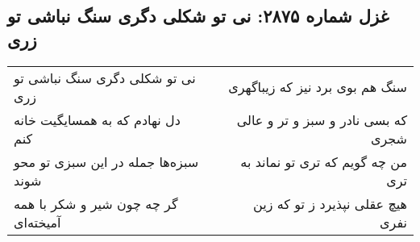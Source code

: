 \begin{center}
\section*{غزل شماره ۲۸۷۵: نی تو شکلی دگری سنگ نباشی تو زری}
\label{sec:2875}
\begin{longtable}{l p{0.5cm} r}
نی تو شکلی دگری سنگ نباشی تو زری
&&
سنگ هم بوی برد نیز که زیباگهری
\\
دل نهادم که به همسایگیت خانه کنم
&&
که بسی نادر و سبز و تر و عالی شجری
\\
سبزه‌ها جمله در این سبزی تو محو شوند
&&
من چه گویم که تری تو نماند به تری
\\
گر چه چون شیر و شکر با همه آمیخته‌ای
&&
هیچ عقلی نپذیرد ز تو که زین نفری
\\
\end{longtable}
\end{center}
